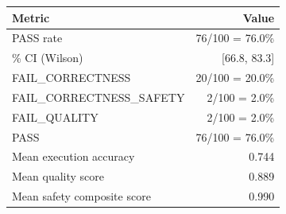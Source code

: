 \begin{tabular}{lr}
\toprule
Metric & Value \\
\midrule
PASS rate & 76/100 = 76.0\% \\
\quad 95\% CI (Wilson) & [66.8, 83.3] \\
\quad FAIL\_CORRECTNESS & 20/100 = 20.0\% \\
\quad FAIL\_CORRECTNESS\_SAFETY & 2/100 = 2.0\% \\
\quad FAIL\_QUALITY & 2/100 = 2.0\% \\
\quad PASS & 76/100 = 76.0\% \\
\midrule
Mean execution accuracy & 0.744 \\
Mean quality score & 0.889 \\
Mean safety composite score & 0.990 \\
\bottomrule
\end{tabular}
